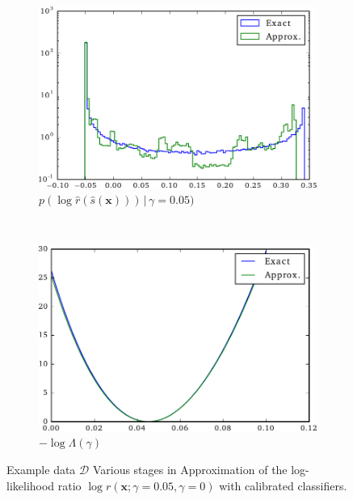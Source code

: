 \documentclass[12pt]{article}
\numberwithin{equation}{section}
\theoremstyle{plain}
\begin{document}
\begin{figure}
    \begin{subfigure}[b]{0.4\textwidth}
        \includegraphics[width=\textwidth]{figures/fig-ratio-dist.pdf}
        \caption{$p( \log \hat r(\hat{s}(\mathbf{x}))) \, | \,\gamma = 0.05)$ }
        \label{fig:decomposed_ratio}
    \end{subfigure}
    ~
    \begin{subfigure}[b]{0.4\textwidth}
        \includegraphics[width=\textwidth]{figures/fig-likelihood.pdf}
        \caption{$-\log \Lambda(\gamma)$ }
        \label{fig:likelihood}
    \end{subfigure}

    \caption{Example data $\mathcal{D}$ Various stages in Approximation of the log-likelihood ratio
             $\log r(\mathbf{x};\gamma=0.05,\gamma=0)$
             with calibrated classifiers. }
\end{figure}
\end{document}
